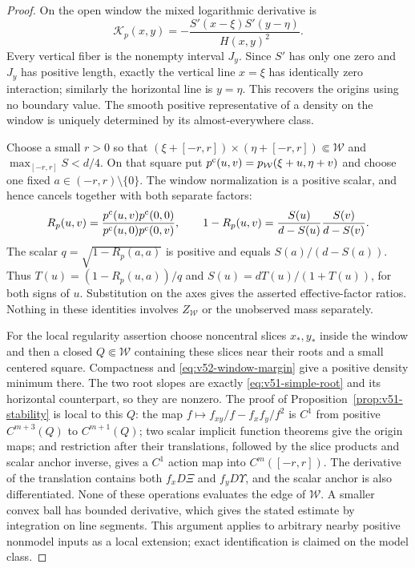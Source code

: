 \begin{proof}
On the open window the mixed logarithmic derivative is
\[
 \mathcal K_p(x,y)=-\frac{S'(x-\xi)S'(y-\eta)}{H(x,y)^2}.
\]
Every vertical fiber is the nonempty interval $J_y$.  Since $S'$ has
only one zero and $J_y$ has positive length, exactly the vertical line
$x=\xi$ has identically zero interaction; similarly the horizontal
line is $y=\eta$.  This recovers the origins using no boundary value.
The smooth positive representative of a density on the window is
uniquely determined by its almost-everywhere class.

Choose a small $r>0$ so that
$(\xi+[-r,r])\times(\eta+[-r,r])\Subset\mathcal W$ and
$\max_{[-r,r]}S<d/4$.  On that square put
$p^{\rm c}(u,v)=p_{\mathcal W}(\xi+u,\eta+v)$ and choose one fixed
$a\in(-r,r)\setminus\{0\}$.  The window normalization is a positive
scalar, and hence cancels together with both separate factors:
\[
 R_p(u,v)=\frac{p^{\rm c}(u,v)p^{\rm c}(0,0)}
                   {p^{\rm c}(u,0)p^{\rm c}(0,v)},\qquad
 1-R_p(u,v)=\frac{S(u)}{d-S(u)}\frac{S(v)}{d-S(v)}.
\]
The scalar $q=\sqrt{1-R_p(a,a)}$ is positive and equals
$S(a)/(d-S(a))$.  Thus $T(u)=(1-R_p(u,a))/q$ and
$S(u)=dT(u)/(1+T(u))$, for both signs of $u$.  Substitution on the
axes gives the asserted effective-factor ratios.  Nothing in these
identities involves $Z_{\mathcal W}$ or the unobserved mass separately.

For the local regularity assertion choose noncentral slices $x_*,y_*$
inside the window and then a closed $Q\Subset\mathcal W$ containing
these slices near their roots and a small centered square.  Compactness
and \eqref{eq:v52-window-margin} give a positive density minimum there.
The two root slopes are exactly \eqref{eq:v51-simple-root} and its
horizontal counterpart, so they are nonzero.  The proof of
Proposition~\ref{prop:v51-stability} is local to this $Q$: the map
$f\mapsto f_{xy}/f-f_xf_y/f^2$ is $C^1$ from positive
$C^{m+3}(Q)$ to $C^{m+1}(Q)$; two scalar implicit function theorems
give the origin maps; and restriction after their translations, followed
by the slice products and scalar anchor inverse, gives a $C^1$ action
map into $C^m([-r,r])$.  The derivative of the translation contains
both $f_xD\Xi$ and $f_yD\Upsilon$, and the scalar anchor is also
differentiated.  None of these operations evaluates the edge of
$\mathcal W$.  A smaller convex ball has bounded derivative, which
gives the stated estimate by integration on line segments.  This
argument applies to arbitrary nearby positive nonmodel inputs as a
local extension; exact identification is claimed on the model class.
\end{proof}

